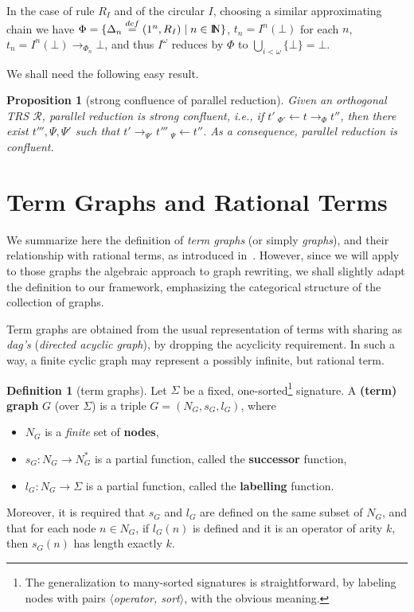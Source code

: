 \documentclass{eptcs}
\theoremstyle{plain}
\newtheorem{proposition}[theorem]{Proposition}
\theoremstyle{definition}
\newtheorem{definition}[theorem]{Definition}
\newcommand{\nat}{{\rm I\!l\!\!N}}
\begin{document}
In the case of rule $R_I$ and of the circular $I$, choosing a similar 
approximating chain we have   $\Phi =    
 \{\Delta_n 
\stackrel{def}{=}(1^n, R_I)\mid 
n \in \nat\}$, $t_n = I^n(\bot)$ for each $n$, 
$t_n = I^n(\bot) \rightarrow_{\Phi_n} \bot$, and thus $I^\omega$ 
reduces 
by $\Phi$ to $\bigcup_{i<\omega}\{\bot\} = \bot$.  

We shall need the following easy result.
\begin{proposition} 
[strong confluence of parallel reduction]
\label{pr:confluence}
Given an orthogonal TRS $\mathcal{R}$, parallel reduction is strong 
confluent, i.e., if $t'\ _{\Phi'}\!\!\leftarrow t \rightarrow_\Phi t''$, 
then there exist $t''', \Psi, \Psi'$ such that $t' \rightarrow_{\Psi'}
t'''\  _\Psi\!\!\leftarrow t''$. As a consequence, parallel reduction is 
confluent.
\end{proposition}

\section{Term Graphs and Rational Terms}
\label{se:Term Graphs and Rational Terms}


We summarize here the definition of {\em term graphs} (or 
simply 
{\em graphs}), and their relationship with rational terms, as 
introduced 
in~\cite{KKSV:AGRS}. However, since we will apply to those graphs the 
algebraic approach to graph rewriting, we shall slightly adapt the 
definition to our framework, emphasizing the categorical 
structure of the collection of graphs.

Term graphs are obtained from the usual representation 
of terms with sharing as {\em dag's} ({\em directed acyclic graph}), by 
dropping the acyclicity requirement. In such a way, a finite cyclic 
graph 
may represent a possibly infinite, but rational term.


\begin{definition}
[term graphs]
\label{de:graphs}
Let $\Sigma$ be a fixed, one-sorted\footnote{The 
generalization to many-sorted signatures is straightforward, by 
labeling nodes with pairs {\em $\langle$operator, sort$\rangle$}, 
with the obvious meaning.} signature. A {\bf (term) graph} $G$
(over $\Sigma$)
  is a triple $G = (N_G,s_G,l_G)$, where
\begin{itemize}
\item	$N_G$ is a {\em finite} set of {\bf nodes\/},
\item	$s_G: N_G \rightarrow N_G^*$ is a partial function, called the 
{\bf 
successor} function,
\item	$l_G:N_G \rightarrow \Sigma$ is a partial function, called the 
{\bf labelling} function.
\end{itemize}
\noindent
Moreover, it is required that $s_G$ and $l_G$ are defined on the same 
subset of $N_G$, and that for each node $n \in N_G$, if $l_G(n)$ is 
defined and it is an operator of arity $k$, then $s_G(n)$ has length 
exactly 
$k$. \end{definition}
\end{document}
